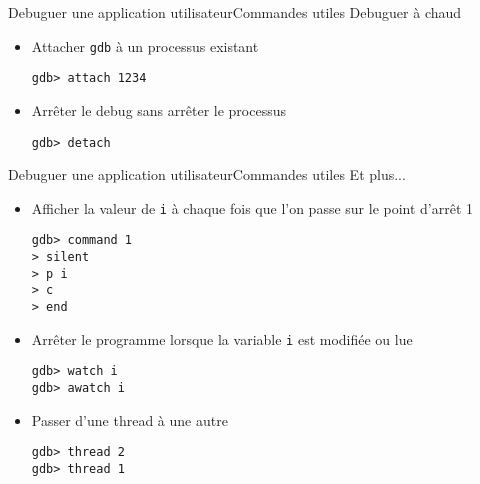 \begin{frame}[fragile=singleslide]{Debuguer une application utilisateur}{Commandes utiles}
  Debuguer à chaud
  \begin{itemize}
  \item Attacher \verb+gdb+ à un processus existant
    \begin{lstlisting}
gdb> attach 1234
    \end{lstlisting}
  \item Arrêter le debug sans arrêter le processus
    \begin{lstlisting}
gdb> detach
     \end{lstlisting}
   \end{itemize}
\end{frame}

\begin{frame}[fragile=singleslide]{Debuguer une application utilisateur}{Commandes utiles}
  Et plus...
  \begin{itemize}
  \item Afficher  la valeur de \verb+i+  à chaque fois  que l'on passe
    sur le point d'arrêt 1
    \begin{lstlisting}
gdb> command 1
> silent
> p i
> c
> end
    \end{lstlisting}
  \item Arrêter le programme lorsque la variable \verb+i+ est modifiée
    ou lue
    \begin{lstlisting}
gdb> watch i
gdb> awatch i
      \end{lstlisting}
    \item Passer d'une thread à une autre
      \begin{lstlisting}
gdb> thread 2
gdb> thread 1
      \end{lstlisting}
    \end{itemize}
\end{frame}




